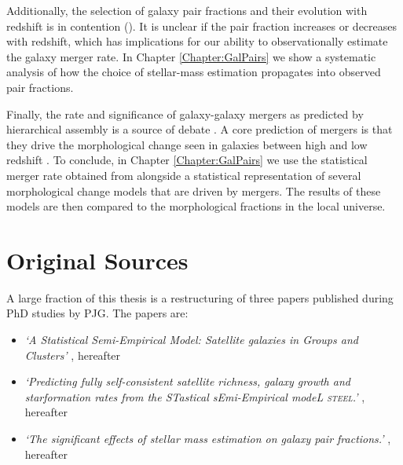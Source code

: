 Additionally, the selection of galaxy pair fractions and their evolution with redshift is in contention (\citet{Man2016RESOLVING03, Mundy2017A3.5}). It is unclear if the pair fraction increases or decreases with redshift, which has implications for our ability to observationally estimate the galaxy merger rate. In Chapter \ref{Chapter:GalPairs} we show a systematic analysis of how the choice of stellar-mass estimation propagates into observed pair fractions.

Finally, the rate and significance of galaxy-galaxy mergers as predicted by \LCDM hierarchical assembly is a source of debate \cite[e.g.][]{Hopkins2010MERGERSMATTER,Hopkins2009HOWMERGERS,Hopkins2010MergersFunctions,Fensch2017High-redshiftFormation,Martin2017TheTime}. A core prediction of mergers is that they drive the morphological change seen in galaxies between high and low redshift \cite[e.g.][]{Bournaud2011HydrodynamicsSpheroids,Bournaud2011StarMergers,Hilz2013}. To conclude, in Chapter \ref{Chapter:GalPairs} we use the statistical merger rate obtained from \steel alongside a statistical representation of several morphological change models that are driven by mergers. The results of these models are then compared to the morphological fractions in the local universe.

\section{Original Sources}

A large fraction of this thesis is a restructuring of three papers published during PhD studies by PJG. The papers are:
\begin{itemize}
    \item \textit{`A Statistical Semi-Empirical Model: Satellite galaxies in Groups and Clusters'}  \citet{Grylls2019AClusters}, hereafter 
    \item \textit{`Predicting fully self-consistent satellite richness, galaxy growth and starformation rates from the STastical sEmi-Empirical modeL \textsc{steel}.'} \citet{Grylls2020PredictingSTEEL}, hereafter 
    \item \textit{`The significant effects of stellar mass estimation on galaxy pair fractions.'} \citet{Grylls2020TheFractions}, hereafter 
\end{itemize}

